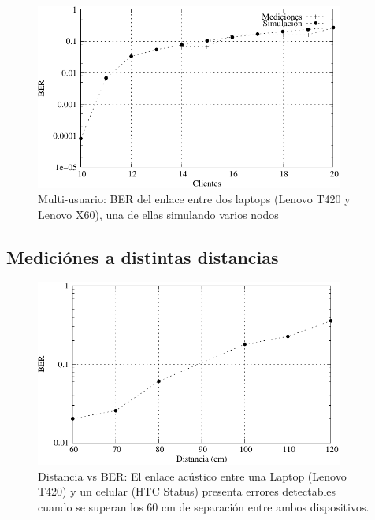 \begin{figure}[t]
  \centering
    \includegraphics[width=4in]{graphs/medidas_clientes_JIS-fig6.pdf}
\caption {Multi-usuario: BER del enlace entre dos laptops (Lenovo T420 y Lenovo X60), una de ellas simulando varios nodos}
\label{fig:acumult}
\end{figure}


%

\subsection{Mediciónes a distintas distancias}

\begin{figure}[t]
  \centering
    \includegraphics[width=4in]{graphs/mediciones-distancia-fig7.pdf}
\caption {Distancia vs BER: El enlace acústico entre una Laptop (Lenovo T420) y un celular (HTC Status) presenta errores detectables cuando se superan los 60 cm de separación entre ambos dispositivos.}
\label{fig:acudist}
\end{figure}

